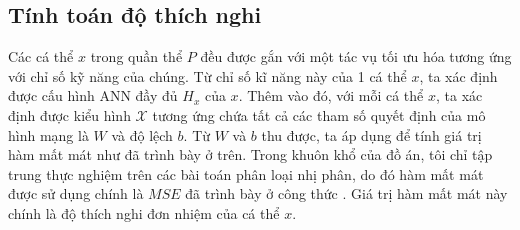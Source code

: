 


\subsection{Tính toán độ thích nghi}
\label{fitness}
Các cá thể $x$ trong quần thể $P$ đều được gắn với một tác vụ tối ưu hóa tương ứng với chỉ số kỹ năng của chúng. Từ chỉ số kĩ năng này của 1 cá thể $x$, ta xác định được cấu hình ANN đầy đủ $H_x$ của $x$. Thêm vào đó, với mỗi cá thể $x$, ta xác định được kiểu hình $\mathcal{X}$ tương ứng chứa tất cả các tham số quyết định của mô hình mạng là $W$ và độ lệch $b$.
Từ $W$ và $b$ thu được, ta áp dụng để tính giá trị hàm mất mát như đã trình bày ở trên. Trong khuôn khổ của đồ án, tôi chỉ tập trung thực nghiệm trên các bài toán phân loại nhị phân, do đó hàm mất mát được sử dụng chính là $MSE$ đã trình bày ở công thức . Giá trị hàm mất mát này chính là độ thích nghi đơn nhiệm của cá thể $x$. 

